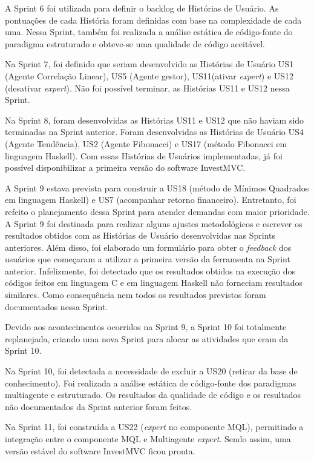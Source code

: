 A Sprint 6 foi utilizada para definir o backlog de Histórias de Usuário. As pontuações de cada História foram definidas com base na complexidade de cada uma. Nessa Sprint, também foi realizada a análise estática de código-fonte do paradigma estruturado e obteve-se uma qualidade de código aceitável.

Na Sprint 7, foi definido que seriam desenvolvido as Histórias de Usuário US1 (Agente Correlação Linear), US5 (Agente gestor), US11(ativar \textit{expert}) e US12 (desativar \textit{expert}). Não foi possível terminar, as Histórias US11 e US12 nessa Sprint.

Na Sprint 8, foram desenvolvidas as Histórias US11 e US12 que não haviam sido terminadas na Sprint anterior. Foram desenvolvidas as Histórias de Usuário US4 (Agente Tendência), US2 (Agente Fibonacci) e US17 (método Fibonacci em linguagem Haskell). Com essas Histórias de Usuários implementadas, já foi possível disponibilizar a primeira versão do software InvestMVC.

A Sprint 9 estava prevista para construir a US18 (método de Mínimos Quadrados em linguagem Haskell) e US7 (acompanhar retorno financeiro). Entretanto, foi refeito o planejamento dessa Sprint para atender demandas com maior prioridade. A Sprint 9 foi destinada para realizar alguns ajustes metodológicos e escrever os resultados obtidos com as Histórias de Usuário desenvolvidas nas Sprints anteriores. Além disso, foi elaborado um formulário para obter o \textit{feedback} dos usuários que começaram a utilizar a primeira versão da ferramenta na Sprint anterior. Infelizmente, foi detectado que os resultados obtidos na execução dos códigos feitos em linguagem C e em linguagem Haskell não forneciam resultados similares. Como consequência nem todos os resultados previstos foram documentados nessa Sprint.

Devido aos acontecimentos ocorridos na Sprint 9, a Sprint 10 foi totalmente replanejada, criando uma nova Sprint para alocar as atividades que eram da Sprint 10.

Na Sprint 10, foi detectada a necessidade de excluir a US20 (retirar da base de conhecimento). Foi realizada a análise estática de código-fonte dos paradigmas multiagente e estruturado. Os resultados da qualidade de código e os resultados não documentados da Sprint anterior foram feitos.

Na Sprint 11, foi construída a US22 (\textit{expert} no componente MQL), permitindo a integração entre o componente MQL e Multiagente \textit{expert}. Sendo assim, uma versão estável do software InvestMVC ficou pronta.

